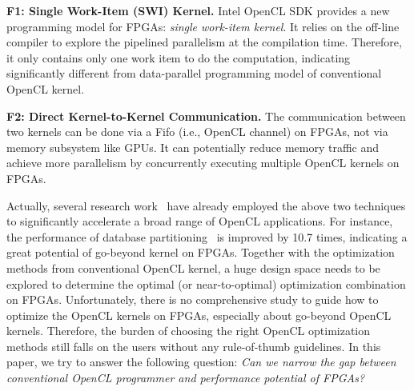 \vspace{0.3em}
\noindent
{\bf F1: Single Work-Item (SWI) Kernel. } Intel OpenCL SDK provides a new programming model for FPGAs: \emph{single work-item kernel}. It relies on the off-line compiler to explore the pipelined parallelism at the compilation time. Therefore, it only contains only one work item to do the computation, indicating significantly different from data-parallel programming model of conventional OpenCL kernel. %

\vspace{0.3em}
\noindent
{\bf F2: Direct Kernel-to-Kernel Communication. }The communication between two kernels can be done via a Fifo (i.e., OpenCL channel) on FPGAs, not via memory subsystem like GPUs. It can potentially reduce memory traffic and achieve more parallelism by concurrently executing multiple OpenCL kernels on FPGAs. 

Actually, several research work~\cite{partition_fpl15, gzip_iwocl14} have already employed the above two techniques to significantly accelerate a broad range of OpenCL applications. For instance, the performance of database partitioning~\cite{partition_fpl15} is improved by 10.7 times, indicating a great potential of go-beyond kernel on FPGAs. Together with the optimization methods from conventional OpenCL kernel, a huge design space needs to be explored to determine the optimal (or near-to-optimal) optimization combination on FPGAs. 
Unfortunately, there is no comprehensive study to guide how to optimize the OpenCL kernels on FPGAs, especially about go-beyond OpenCL kernels. Therefore, the burden of choosing the right OpenCL optimization methods still falls on the users without any rule-of-thumb guidelines. %
In this paper, we try to answer the following question: {\em Can we narrow the gap between conventional OpenCL programmer and performance potential of FPGAs?}


